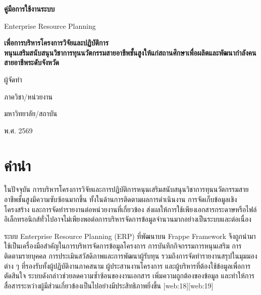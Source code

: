 \documentclass[17pt,a4paper]{extarticle}
\begin{document}
\begin{titlepage}
  \centering
  \vspace*{3cm}

  {\Huge \bfseries
    คู่มือการใช้งานระบบ \par
    Enterprise Resource Planning \par}

  \vspace{2cm}

  {\Large \bfseries เพื่อการบริหารโครงการวิจัยและปฏิบัติการ\\
    หนุนเสริมสนับสนุนวิชาการทุนนวัตกรรมสายอาชีพชั้นสูงให้แก่สถานศึกษาเพื่อผลิตและพัฒนากำลังคนสายอาชีพระดับจังหวัด \par \par}

  \vspace{2cm}
  {\Large ผู้จัดทำ \par}

  \vspace{2cm}

  {\large
    ภาควิชา/หน่วยงาน \par
    มหาวิทยาลัย/สถาบัน \par
    พ.ศ. 2569 \par} %

\end{titlepage}

\tableofcontents
\newpage
\listoffigures
\newpage
\section*{คำนำ}
ในปัจจุบัน การบริหารโครงการวิจัยและการปฏิบัติการหนุนเสริมสนับสนุนวิชาการทุนนวัตกรรมสายอาชีพชั้นสูงมีความซับซ้อนมากขึ้น ทั้งในด้านการติดตามผลการดำเนินงาน การจัดเก็บข้อมูลเชิงโครงสร้าง และการจัดทำรายงานต่อหน่วยงานที่เกี่ยวข้อง ส่งผลให้การใช้เพียงเอกสารกระดาษหรือไฟล์อิเล็กทรอนิกส์ทั่วไปอาจไม่เพียงพอต่อการบริหารจัดการข้อมูลจำนวนมากอย่างเป็นระบบและต่อเนื่อง

ระบบ Enterprise Resource Planning (ERP) ที่พัฒนาบน Frappe Framework จึงถูกนำมาใช้เป็นเครื่องมือสำคัญในการบริหารจัดการข้อมูลโครงการ การบันทึกกิจกรรมการหนุนเสริม การติดตามรายบุคคล การประเมินสวัสดิภาพและการพัฒนาผู้รับทุน รวมถึงการจัดทำรายงานสรุปในมุมมองต่าง ๆ ที่รองรับทั้งผู้ปฏิบัติงานภาคสนาม ผู้ประสานงานโครงการ และผู้บริหารที่ต้องใช้ข้อมูลเพื่อการตัดสินใจ ระบบดังกล่าวช่วยลดความซ้ำซ้อนของงานเอกสาร เพิ่มความถูกต้องของข้อมูล และทำให้การสื่อสารระหว่างผู้มีส่วนเกี่ยวข้องเป็นไปอย่างมีประสิทธิภาพยิ่งขึ้น [web:18][web:19]
\end{document}
